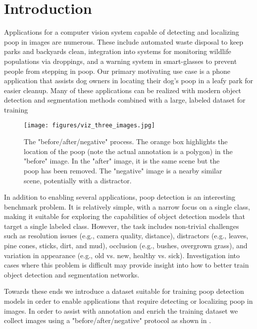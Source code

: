 \documentclass[10pt,twocolumn,letterpaper]{article}
\begin{document}
\section{Introduction}
\label{sec:intro}

Applications for a computer vision system capable of detecting and localizing poop in images are numerous.
These include automated waste disposal to keep parks and backyards clean, integration into systems for
  monitoring wildlife populations via droppings, and a warning system in smart-glasses to prevent people from
  stepping in poop.
Our primary motivating use case is a phone application that assists dog owners in locating their dog's poop
  in a leafy park for easier cleanup.
Many of these applications can be realized with modern object detection and segmentation methods
  \cite{sandler_mobilenetv2_2018, siam_rtseg_2018, yu_mobilenet_yolo_2023} combined with a large, labeled
  dataset for training


\begin{figure}[ht]
\centering
\texttt{[image: figures/viz\_three\_images.jpg]}
\caption[]{
    The "before/after/negative" process.
    The orange box highlights the location of the poop (note the
    actual annotation is a polygon) in the "before" image.
    In the "after" image, it is the same scene but the poop has been removed.
    The "negative" image is a nearby similar scene, potentially with a distractor.
}
\label{fig:ThreeImages}
\end{figure}


In addition to enabling several applications, poop detection is an interesting benchmark problem.
It is relatively simple, with a narrow focus on a single class, making it suitable for exploring the
  capabilities of object detection models that target a single labeled class.
However, the task includes non-trivial challenges such as resolution issues (e.g., camera quality,
  distance), distractors (e.g., leaves, pine cones, sticks, dirt, and mud), occlusion (e.g., bushes, overgrown
  grass), and variation in appearance (e.g., old vs. new, healthy vs. sick).
Investigation into cases where this problem is difficult may provide insight
into how to better train object detection and segmentation networks.

Towards these ends we introduce a dataset suitable for training poop detection
models in order to enable applications that require detecting or localizing
poop in images. In order to assist with annotation and enrich the training
dataset we collect images using a "before/after/negative" protocol as shown in
. 
\end{document}
